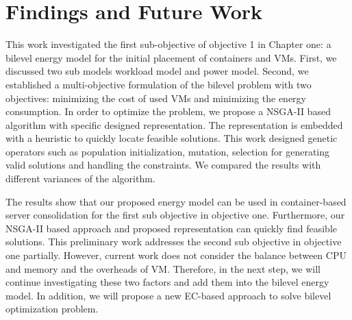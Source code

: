 \section{Findings and Future Work}
\label{sec:con}

This work investigated the first sub-objective of objective 1 in Chapter one: a bilevel energy model for the initial placement of containers and VMs. First, we discussed two sub models workload model and power model. Second, we established a multi-objective formulation of the bilevel problem with two objectives: minimizing the cost of used VMs and minimizing the energy consumption. In order to optimize the problem, we propose a NSGA-II based algorithm with specific designed representation. The representation is embedded with a heuristic to quickly locate feasible solutions. This work designed genetic operators such as population initialization, mutation, selection for generating valid solutions and handling the constraints. We compared the results with different variances of the algorithm. 

The results show that our proposed energy model can be used in container-based server consolidation for the first sub objective in objective one. Furthermore, our NSGA-II based approach and proposed representation can quickly find feasible solutions. This preliminary work addresses the second sub objective in objective one partially. However, current work does not consider the balance between CPU and memory and the overheads of VM. Therefore, in the next step, we will continue investigating these two factors and add them into the bilevel energy model. In addition, we will propose a new EC-based approach to solve bilevel optimization problem.

